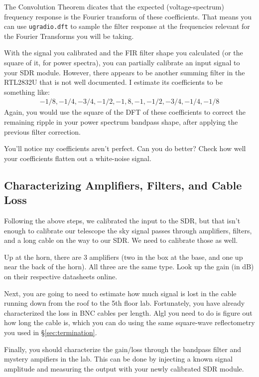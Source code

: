 \documentclass[11pt,preprint]{aastex}
\begin{document}
The Convolution Theorem dicates that the expected (voltage-spectrum)
frequency response is the Fourier transform of these coefficients.
That means you can use {\tt ugradio.dft} to sample the 
filter response at the frequencies
relevant for the Fourier Transforms you will be taking.

With the signal you calibrated and the FIR filter shape you calculated
(or the square of it, for power spectra), you can
partially calibrate an input signal to your SDR module. However, there
appears to be another summing filter in the RTL2832U that is not
well documented. I estimate its coefficients to be something like:
$$
\begin{aligned}
-1/8, -1/4, -3/4, -1/2, -1, 8, -1, -1/2, -3/4, -1/4, -1/8
\end{aligned}
$$
Again, you would use the square of the DFT of these coefficients to correct
the remaining ripple in your power spectrum bandpass shape, after applying
the previous filter correction.

You'll notice my coefficients aren't perfect. Can you do better? Check how
well your coefficients flatten out a white-noise signal.

\subsection{Characterizing Amplifiers, Filters, and Cable Loss}

Following the above steps, we calibrated the input to the SDR, but
that isn't enough to calibrate our telescope the sky signal passes through
amplifiers, filters, and a long cable on the way to our SDR. We need
to calibrate those as well.

Up at the horn, there are 3 amplifiers (two in the box at the base,
and one up near the back of the horn). All three are the same type.
Look up the gain (in dB) on their respective datasheets online.

Next, you are going to need to estimate how much signal is lost in the
cable running down from the roof to the 5th floor lab. Fortunately, you
have already characterized the loss in BNC cables per length. Algl you need
to do is figure out how long the cable is, which you can do using the
same square-wave reflectometry you used in \S\ref{sec:termination}.

Finally, you should characterize the gain/loss through the bandpass
filter and mystery ampifiers in the lab. This can be done by injecting a
known signal amplitude and measuring the output with your newly calibrated
SDR module.
\end{document}
